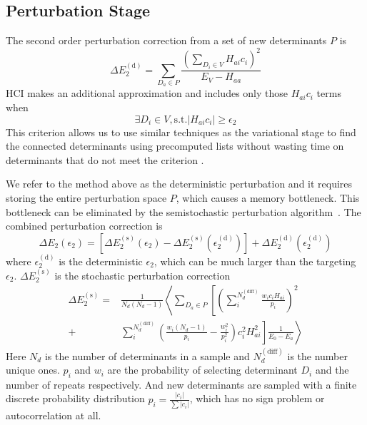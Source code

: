 \subsection{Perturbation Stage}
The second order perturbation correction from a set of new determinants $P$ is
$$\Delta E_2^{(\mathrm{d})} = \sum _{D _{a} \in P} \frac{\left(\sum _{D _{i} \in V} H _{a i} c _{i}\right) ^{2}}{E _{V} - H _{a a}}$$
HCI makes an additional approximation and includes only those $H_{ai}c_{i}$ terms when
$$\exists D _{i} \in V , \mathrm{s . t .} \left|H _{a i} c _{i}\right| \ge \epsilon _{2}$$
This criterion allows us to use similar techniques as the variational stage to find the connected determinants using precomputed lists without wasting time on determinants that do not meet the criterion \cite{holmes2016heat}.

We refer to the method above as the deterministic perturbation and it requires storing the entire perturbation space $P$, which causes a memory bottleneck.
This bottleneck can be eliminated by the semistochastic perturbation algorithm~\cite{sharma2017semistochastic}.
The combined perturbation correction is 
$$\Delta E _{2} \left(\epsilon _{2}\right) = \left[\Delta E _{2} ^{\left(\mathrm{s}\right)} \left(\epsilon _{2} \right) - \Delta E _{2} ^{\left(\mathrm{s}\right)} \left(\epsilon _{2} ^{\left(\mathrm{d}\right)}\right)\right] + \Delta E _{2} ^{\left(\mathrm{d}\right)} \left(\epsilon _{2} ^{\left(\mathrm{d}\right)}\right)$$
where $\epsilon _{2} ^{\left(\mathrm{d}\right)}$ is the deterministic $\epsilon_2$, which can be much larger than the targeting $\epsilon_2$.
$\Delta E _{2} ^{\left(\mathrm{s}\right)}$ is the stochastic perturbation correction
\begin{align*}
\Delta E _{2} ^{\left(\mathrm{s}\right)} = & \frac{1}{N _{d} \left(N _{d} - 1\right)} \left\langle \sum _{D _{a} \in P} \left[\left(\sum _{i} ^{N _{d} ^{\mathrm{( d i f f )}}} \frac{w _{i} c _{i} H _{a i}}{p _{i}}\right) ^{2} \right. \right. \\ + 
 & \left. \left. \sum _{i} ^{N _{d} ^{\mathrm{( d i f f )}}} \left(\frac{w _{i} \left(N _{d} - 1\right)}{p _{i}} - \frac{w _{i} ^{2}}{p _{i} ^{2}}\right) c _{i} ^{2} H _{a i} ^{2}\right] \frac{1}{E _{0} - E _{a}} \right\rangle
\end{align*}
Here $N_d$ is the number of determinants in a sample and $N_d^{\mathrm{(diff)}}$ is the number unique ones.
$p_i$ and $w_i$ are the probability of selecting determinant $D_i$ and the number of repeats respectively.
And new determinants are sampled with a finite discrete probability distribution $p _{i} = \frac{\left|c _{i}\right|}{\sum \left|c _{i}\right|}$, which has no sign problem or autocorrelation at all.

